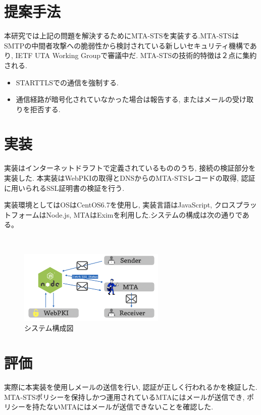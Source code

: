 \documentclass[a4j, 10pt, uplatex]{jsarticle}
\begin{document}
\section{提案手法}

本研究では上記の問題を解決するためにMTA-STSを実装する.MTA-STSはSMTPの中間者攻撃への脆弱性から検討されている新しいセキュリティ機構であり, IETF UTA Working Groupで審議中だ. \cite{draft} MTA-STSの技術的特徴は２点に集約される.

\begin{itemize}
\item STARTTLSでの通信を強制する.
\item 通信経路が暗号化されていなかった場合は報告する, またはメールの受け取りを拒否する.
\end{itemize}

\section{実装}

実装はインターネットドラフトで定義されているもののうち, 接続の検証部分を実装した. 本実装はWebPKIの取得とDNSからのMTA-STSレコードの取得, 認証に用いられるSSL証明書の検証を行う.

実装環境としてはOSはCentOS6.7を使用し, 実装言語はJavaScript, クロスプラットフォームはNode.js, MTAはEximを利用した.システムの構成は次の通りである。

\begin{figure}[htbp]
　\begin{center}
      \includegraphics[width=7cm]{system.png}
      \caption{システム構成図}
    \end{center}
\end{figure}

\section{評価}

実際に本実装を使用しメールの送信を行い, 認証が正しく行われるかを検証した. MTA-STSポリシーを保持しかつ運用されているMTAにはメールが送信でき, ポリシーを持たないMTAにはメールが送信できないことを確認した.
\end{document}
